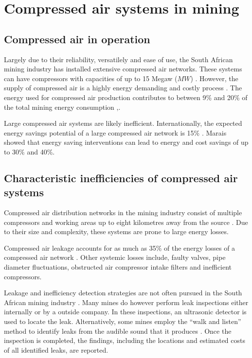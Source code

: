\section{Compressed air systems in mining}
	\subsection{Compressed air in operation}\label{key}
		Largely due to their reliability, versatilely and ease of use, the South African mining industry has installed extensive compressed air networks. These systems can have compressors with capacities of up to 15 Mega\gls*{w} ($MW$) \cite{Marais2012PhD}.
		However, the supply of compressed air is a highly energy demanding and costly process \cite{padachi2009energy}. The energy used for compressed air production contributes to between 9\% and 20\% of the total mining energy consumption	\cite{Eskom2010Energy},\cite{du2011development}. 
		\par
		Large compressed air systems are likely inefficient. Internationally, the expected energy savings potential of a large compressed air network is 15\% \cite{neale2009compressed}. Marais \cite{marais2013simplification} showed that energy saving interventions can lead to energy and cost savings of up to 30\% and 40\%. 
	 
	\subsection{Characteristic inefficiencies of compressed air systems}
		Compressed air distribution networks in the mining industry consist of multiple compressors and working areas up to eight kilometres away from the source \cite{Marais2012PhD}. Due to their size and complexity, these systems are prone to large energy losses.
		\par 
		Compressed air leakage accounts for as much as 35\% of the energy losses of a compressed air network \cite{Lawrence2004Improving}. Other systemic losses include, faulty valves, pipe diameter fluctuations, obstructed air compressor intake filters and inefficient compressors. 	
	
		Leakage and inefficiency detection strategies are not often pursued in the South African mining industry \cite{vanTonder2010Masters}. Many mines do however perform leak inspections either internally or by a outside company. In these inspections, an ultrasonic detector is used to locate the leak. Alternatively, some mines employ the \enquote{walk and listen} method to identify leaks from the audible sound that it produces \cite{vanTonder2010Masters}. Once the inspection is completed, the findings, including the locations and estimated costs of all identified leaks, are reported.
		
